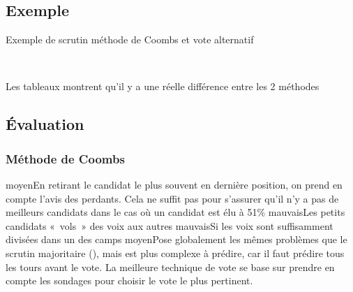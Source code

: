 \documentclass[../report]{subfiles}
\begin{document}
  \subsection{Exemple}

  \begin{table}[h]
    \begin{center}
      \caption{Exemple de scrutin méthode de Coombs et vote alternatif}%
      \label{fig:diff:coombs:caslim1}
      \\[1em]
    \end{center}
  \end{table}

  Les tableaux  montrent qu'il y a une réelle différence entre les 2 méthodes

  \subsection{Évaluation}
  \subsubsection{Méthode de Coombs}
  \tabcritere%
    {moyen}{En retirant le candidat le plus souvent en dernière position, on prend en compte l'avis des perdants. Cela ne suffit pas pour s'assurer qu'il n'y a pas de meilleurs candidats dans le cas où un candidat est élu à 51\%}%
    {mauvais}{Les petits candidats «~vols~» des voix aux autres}%
    {mauvais}{Si les voix sont suffisamment divisées dans un des camps}%
    {moyen}{Pose globalement les mêmes problèmes que le scrutin majoritaire (), mais est plus complexe à prédire, car il faut prédire tous les tours avant le vote. La meilleure technique de vote se base sur prendre en compte les sondages pour choisir le vote le plus pertinent.}
\end{document}
